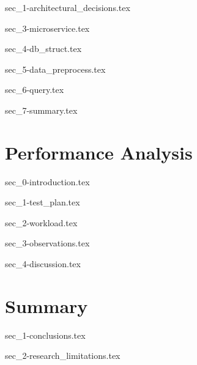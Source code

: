 \documentclass[a4paper,oneside,12pt]{report}
\begin{document}
{sec_1-architectural_decisions.tex}

{sec_3-microservice.tex}

{sec_4-db_struct.tex}

{sec_5-data_preprocess.tex}

{sec_6-query.tex}

{sec_7-summary.tex}

\chapter{Performance Analysis}
\label{ch:results}

{sec_0-introduction.tex}

{sec_1-test_plan.tex}

{sec_2-workload.tex}

{sec_3-observations.tex}

{sec_4-discussion.tex}

\chapter{Summary}
\label{ch:summary}

{sec_1-conclusions.tex}

{sec_2-research_limitations.tex}


\graphicspath{ {./images/} }

% 
% 
\printbibliography[title={References}]
\end{document}
